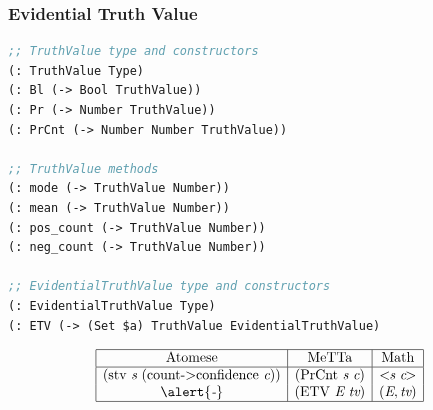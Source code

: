 \documentclass[aspectratio=169]{beamer}
\newcommand{\TTV}{\textit{tv}}
\newcommand{\ltv}[1]{<\!\!#1\!\!>}
\newcommand{\letv}[2]{(#1, #2)}
\begin{document}

\begin{frame}[fragile]
  \frametitle{Evidential Truth Value}

\begin{lstlisting}[language=lisp]
;; TruthValue type and constructors
(: TruthValue Type)
(: Bl (-> Bool TruthValue))
(: Pr (-> Number TruthValue))
(: PrCnt (-> Number Number TruthValue))

;; TruthValue methods
(: mode (-> TruthValue Number))
(: mean (-> TruthValue Number))
(: pos_count (-> TruthValue Number))
(: neg_count (-> TruthValue Number))

;; EvidentialTruthValue type and constructors
(: EvidentialTruthValue Type)
(: ETV (-> (Set $a) TruthValue EvidentialTruthValue)
\end{lstlisting}

{\small
  $$
  \begin{array}{|c|c|c|}
    \hline
    \text{Atomese} & \text{MeTTa} & \text{Math} \\
    \hline
    (\text{stv}\ \textit{s}\ (\text{count->confidence}\ \textit{c})) & (\text{PrCnt}\ \textit{s}\ \textit{c}) & \ltv{\textit{s}\ \textit{c}} \\
    \alert{\textit{-}} & (\text{ETV}\ \textit{E}\ \TTV) & \letv{\textit{E}}{\TTV} \\
    \hline
  \end{array}
  $$
}

\end{frame}
\end{document}
